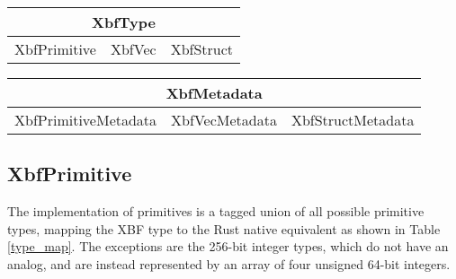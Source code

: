 \documentclass[conference]{IEEEtran}
\begin{document}
\begin{table}[htbp]
	\begin{center}
		\begin{tabular}{|c|c|c|}
			\hline
			\multicolumn{3}{|c|}{XbfType}     \\
			\hline
			XbfPrimitive & XbfVec & XbfStruct \\
			\hline
		\end{tabular}
	\end{center}
\end{table}

\begin{table}[htbp]
	\begin{center}
		\begin{tabular}{|c|c|c|}
			\hline
			\multicolumn{3}{|c|}{XbfMetadata}                         \\
			\hline
			XbfPrimitiveMetadata & XbfVecMetadata & XbfStructMetadata \\
			\hline
		\end{tabular}
	\end{center}
\end{table}

\subsection{XbfPrimitive}\label{primitives}

The implementation of primitives is a tagged union of all possible primitive types, mapping the XBF type to the Rust native equivalent as shown in Table \ref{type_map}. The exceptions are the 256-bit integer types, which do not have an analog, and are instead represented by an array of four unsigned 64-bit integers.
\end{document}
